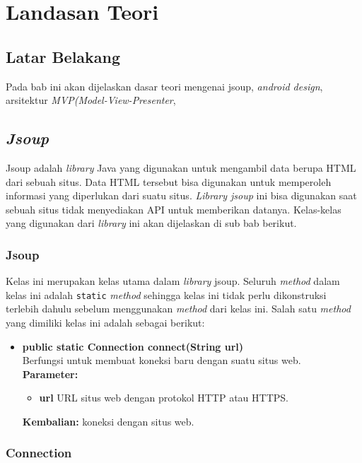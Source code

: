 \chapter{Landasan Teori}
\label{chap:teori}

\section{Latar Belakang}
\label{sec:latar} 
Pada bab ini akan dijelaskan dasar teori mengenai jsoup, \textit{android design}, arsitektur \textit{MVP(Model-View-Presenter},  

\section{\textit{Jsoup}}
\label{sec:jsoup}
Jsoup adalah \textit{library} Java yang digunakan untuk mengambil data berupa HTML dari sebuah situs. Data HTML tersebut bisa digunakan untuk memperoleh informasi yang diperlukan dari suatu situs\cite{jsoup}. \textit{Library jsoup} ini bisa digunakan saat sebuah situs tidak menyediakan API untuk memberikan datanya. Kelas-kelas yang digunakan dari \textit{library} ini akan dijelaskan di sub bab berikut.

\subsection{Jsoup}

Kelas ini merupakan kelas utama dalam \textit{library} jsoup. Seluruh \textit{method} dalam kelas ini adalah \texttt{static} \textit{method} sehingga kelas ini tidak perlu dikonstruksi terlebih dahulu sebelum menggunakan \textit{method} dari kelas ini. Salah satu \textit{method} yang dimiliki kelas ini adalah sebagai berikut:
\begin{itemize}
	\item \textbf{public static Connection connect(String url)} \\
		Berfungsi untuk membuat koneksi baru dengan suatu situs web. \\
		\textbf{Parameter:}
		\begin{itemize}
			\item \textbf{url} URL situs web dengan protokol HTTP atau HTTPS.
		\end{itemize}
		\textbf{Kembalian:} koneksi dengan situs web.
\end{itemize}

\subsection{Connection}

